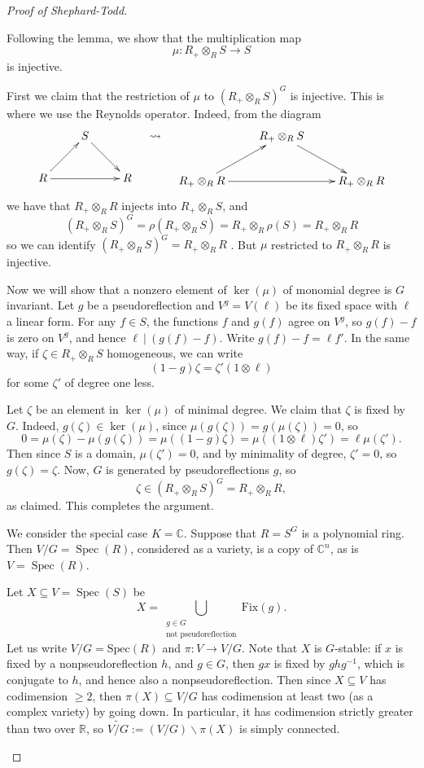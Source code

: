 \documentclass[12pt]{amsart}
\theoremstyle{definition}
\numberwithin{equation}{theorem}
\def\ker{\operatorname{ker}}
\def\Spec{\operatorname{Spec}}
\def\CC{\mathbb{C}}
\def\RR{\mathbb{R}}
\def\to{\longrightarrow}
\begin{document}
\begin{proof}[Proof of Shephard-Todd]
\begin{asparaenum}
\item Following the lemma, we show that the multiplication map
\[ \mu: R_+ \otimes_{R} S \to S\]
is injective.

First we claim that the restriction of $\mu$ to $(R_+ \otimes_R S)^G$ is injective. This is where we use the Reynolds operator. Indeed, from the diagram
\[ \xymatrix{ & S \ar[dr] & \\ R \ar[rr] \ar[ur] & & R} \quad \rightsquigarrow \quad \xymatrix{ & R_+ \otimes_R S \ar[dr] & \\ R_+ \otimes_R R \ar[ur] \ar[rr] & & R_+ \otimes_R R}\]
we have that $R_+ \otimes_R R$ injects into $R_+ \otimes_R S$, and
\[ (R_+ \otimes_R S)^G = \rho ( R_+ \otimes_R S ) = R_+ \otimes_R \rho(S) = R_+ \otimes_R R\]
so we can identify $(R_+ \otimes_R S)^G = R_+ \otimes_R R$ . But $\mu$ restricted to $R_+ \otimes_R R$ is injective.

Now we will show that a nonzero element of $\ker(\mu)$ of monomial degree is $G$ invariant.
 Let $g$ be a pseudoreflection and $V^g = V(\ell)$ be its fixed space with $\ell$ a linear form. For any $f\in S$, the functions $f$ and $g(f)$ agree on $V^g$, so $g(f)-f$ is zero on $V^g$, and hence $\ell \ | \ (g(f) - f)$.
Write $g(f) - f = \ell f'$. In the same way, if $\zeta\in R_+ \otimes_{R} S$ homogeneous, we can write
\[ (1-g)\zeta = \zeta' (1\otimes \ell)\]
for some $\zeta'$ of degree one less.

Let $\zeta$ be an element in $\ker(\mu)$ of minimal degree. We claim that $\zeta$ is fixed by $G$. Indeed, $g(\zeta) \in \ker(\mu)$, since $\mu(g(\zeta))=g(\mu(\zeta))=0$, so
\[ 0 = \mu(\zeta) - \mu(g(\zeta)) = \mu((1-g) \zeta) = \mu((1\otimes \ell) \zeta') = \ell \mu(\zeta').\]
Then since $S$ is a domain, $\mu(\zeta')=0$, and by minimality of degree, $\zeta'=0$, so $g(\zeta)=\zeta$. Now, $G$ is generated by pseudoreflections $g$, so 
\[ \zeta \in (R_+ \otimes_R S)^G = R_+ \otimes_R R,\]
as claimed. This completes the argument.


\item We consider the special case $K=\CC$.
Suppose that $R=S^G$ is a polynomial ring. Then $V/G=\Spec(R)$, considered as a variety, is a copy of $\CC^n$, as is $V=\Spec(R)$.

Let  $X\subseteq V = \Spec(S)$ be 
\[ X= \bigcup_ {\substack{g\in G\\ \text{not pseudoreflection}}} \mathrm{Fix}(g).\]
Let us write $V/G=\mathrm{Spec}(R)$ and $\pi :  V\to V/G$. Note that $X$ is $G$-stable: if $x$ is fixed by a nonpseudoreflection $h$, and $g\in G$, then $gx$ is fixed by $ghg^{-1}$, which is conjugate to $h$, and hence also a nonpseudoreflection.
 Then since $X\subseteq V$ has codimension $\geq 2$, then $\pi(X) \subseteq V/G$ has codimension at least two (as a complex variety) by going down. In particular, it has codimension strictly greater than two over $\RR$, so $\widetilde{V/G} := (V/G) \smallsetminus \pi(X)$ is simply connected.


\end{asparaenum}
\end{proof}
\end{document}
